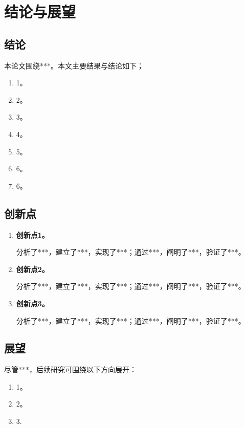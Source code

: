 \chapter{结论与展望}

\section{结论}

本论文围绕***。本文主要结果与结论如下；

\begin{enumerate}[label=(\arabic*)]
	\item 1。
	
	\item 2。
	
	\item 3。
	
	\item 4。
	
	\item 5。
	
	\item 6。
	
	\item 6。
\end{enumerate}


\section{创新点}

\begin{enumerate}[label=(\arabic*)]
	\item\textbf{创新点1。}	
	
	\hspace{2em}分析了***，建立了***，实现了***；通过***，阐明了***，验证了***。
	
	
	\item\textbf{创新点2。}	
	
	\hspace{2em}分析了***，建立了***，实现了***；通过***，阐明了***，验证了***。
	
	
	\item\textbf{创新点3。}	
	
	\hspace{2em}分析了***，建立了***，实现了***；通过***，阐明了***，验证了***。
	
\end{enumerate}








\section{展望}

尽管***，后续研究可围绕以下方向展开：


\begin{enumerate}[label=(\arabic*).]
	\item 1。	
	
	\item 2。
	
	\item 3.
\end{enumerate}

